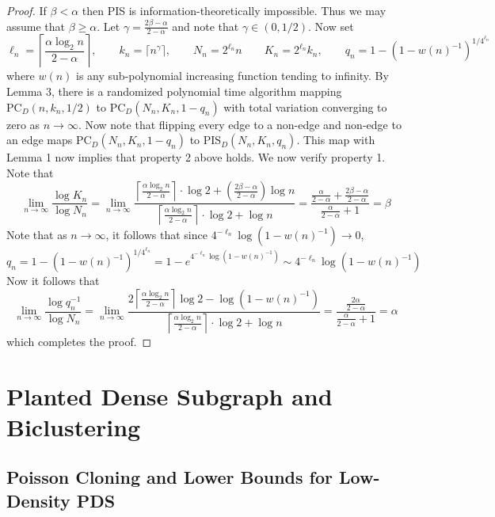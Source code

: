 \documentclass[11pt]{article}
\begin{document}
\begin{proof}
If $\beta < \alpha$ then PIS is information-theoretically impossible. Thus we may assume that $\beta \ge \alpha$. Let $\gamma = \frac{2\beta - \alpha}{2 - \alpha}$ and note that $\gamma \in (0, 1/2)$. Now set
$$\ell_n = \left\lceil \frac{\alpha \log_2 n}{2 - \alpha} \right\rceil, \quad \quad k_n = \lceil n^{\gamma} \rceil, \quad \quad N_n = 2^{\ell_n} n \quad \quad K_n = 2^{\ell_n} k_n, \quad \quad q_n = 1 - (1 - w(n)^{-1})^{1/4^{\ell_n}}$$
where $w(n)$ is any sub-polynomial increasing function tending to infinity. By Lemma 3, there is a randomized polynomial time algorithm mapping $\text{PC}_D(n, k_n, 1/2)$ to $\text{PC}_D(N_n, K_n, 1 - q_n)$ with total variation converging to zero as $n \to \infty$. Now note that flipping every edge to a non-edge and non-edge to an edge maps $\text{PC}_D(N_n, K_n, 1 - q_n)$ to $\text{PIS}_D(N_n, K_n, q_n)$. This map with Lemma 1 now implies that property 2 above holds. We now verify property 1. Note that
$$\lim_{n \to \infty} \frac{\log K_n}{\log N_n} = \lim_{n \to \infty} \frac{\left\lceil \frac{\alpha \log_2 n}{2 - \alpha} \right\rceil \cdot \log 2 + \left( \frac{2\beta - \alpha}{2 - \alpha} \right) \log n}{\left\lceil \frac{\alpha \log_2 n}{2 - \alpha} \right\rceil\cdot \log 2 + \log n} = \frac{\frac{\alpha}{2 - \alpha} + \frac{2\beta - \alpha}{2 - \alpha}}{\frac{\alpha}{2 - \alpha} + 1} = \beta$$
Note that as $n \to \infty$, it follows that since $4^{-\ell_n} \log(1 - w(n)^{-1}) \to 0$,
$$q_n = 1 - (1 - w(n)^{-1})^{1/4^{\ell_n}} = 1 - e^{4^{-\ell_n} \log(1 - w(n)^{-1})} \sim 4^{-\ell_n} \log(1 - w(n)^{-1})$$
Now it follows that
$$\lim_{n \to \infty} \frac{\log q_n^{-1}}{\log N_n} = \lim_{n \to \infty} \frac{2\left\lceil \frac{\alpha \log_2 n}{2 - \alpha} \right\rceil \log 2 - \log(1 - w(n)^{-1})}{\left\lceil \frac{\alpha \log_2 n}{2 - \alpha} \right\rceil\cdot \log 2 + \log n} = \frac{\frac{2\alpha}{2 - \alpha}}{\frac{\alpha}{2 - \alpha} + 1} = \alpha$$
which completes the proof.
\end{proof}

\section{Planted Dense Subgraph and Biclustering}

\subsection{Poisson Cloning and Lower Bounds for Low-Density PDS}
\end{document}
